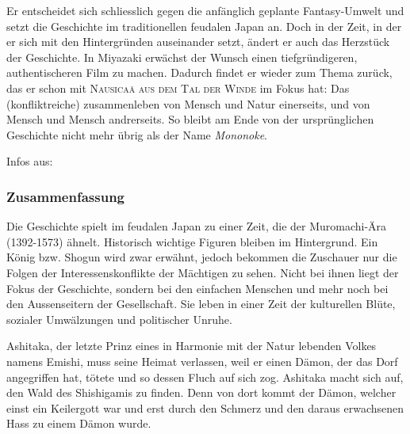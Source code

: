 Er entscheidet sich schliesslich gegen die anfänglich geplante Fantasy-Umwelt und setzt die Geschichte im traditionellen feudalen Japan an. Doch in der Zeit, in der er sich mit den Hintergründen auseinander setzt, ändert er auch das Herzstück der Geschichte. In Miyazaki erwächst der Wunsch einen tiefgründigeren, authentischeren Film zu machen. Dadurch findet er wieder zum Thema zurück, das er schon mit \textsc{Nausicaä aus dem Tal der Winde} im Fokus hat: Das (konfliktreiche) zusammenleben von Mensch und Natur einerseits, und von Mensch und Mensch andrerseits. So bleibt am Ende von der ursprünglichen Geschichte nicht mehr übrig als der Name \emph{Mononoke}. 

Infos aus:

\subsubsection{Zusammenfassung}
Die Geschichte spielt im feudalen Japan zu einer Zeit, die der Muromachi-Ära (1392-1573) ähnelt. Historisch wichtige Figuren bleiben im Hintergrund. Ein König bzw. Shogun wird zwar erwähnt, jedoch bekommen die Zuschauer nur die Folgen der Interessenskonflikte der Mächtigen zu sehen. Nicht bei ihnen liegt der Fokus der Geschichte, sondern bei den einfachen Menschen und mehr noch bei den Aussenseitern der Gesellschaft. Sie leben in einer Zeit der kulturellen Blüte, sozialer Umwälzungen und politischer Unruhe. 

Ashitaka, der letzte Prinz eines in Harmonie mit der Natur lebenden Volkes namens Emishi, muss seine Heimat verlassen, weil er einen Dämon, der das Dorf angegriffen hat, tötete und so dessen Fluch auf sich zog. Ashitaka macht sich auf, den Wald des Shishigamis zu finden. Denn von dort kommt der Dämon, welcher einst ein Keilergott war und erst durch den Schmerz und den daraus erwachsenen Hass zu einem Dämon wurde. 

